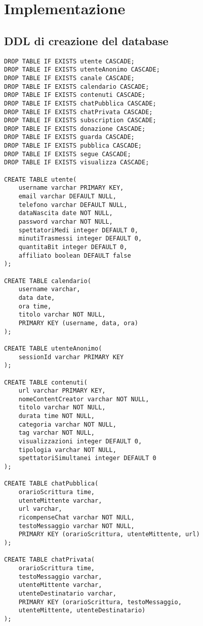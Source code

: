 \section{Implementazione}
\subsection{DDL di creazione del database}





\begin{lstlisting}
DROP TABLE IF EXISTS utente CASCADE;
DROP TABLE IF EXISTS utenteAnonimo CASCADE;
DROP TABLE IF EXISTS canale CASCADE;
DROP TABLE IF EXISTS calendario CASCADE;
DROP TABLE IF EXISTS contenuti CASCADE;
DROP TABLE IF EXISTS chatPubblica CASCADE;
DROP TABLE IF EXISTS chatPrivata CASCADE;
DROP TABLE IF EXISTS subscription CASCADE;
DROP TABLE IF EXISTS donazione CASCADE;
DROP TABLE IF EXISTS guarda CASCADE;
DROP TABLE IF EXISTS pubblica CASCADE;
DROP TABLE IF EXISTS segue CASCADE;
DROP TABLE IF EXISTS visualizza CASCADE;

CREATE TABLE utente(
    username varchar PRIMARY KEY,
    email varchar DEFAULT NULL,
    telefono varchar DEFAULT NULL,
    dataNascita date NOT NULL,
    password varchar NOT NULL,
    spettatoriMedi integer DEFAULT 0,
    minutiTrasmessi integer DEFAULT 0,
    quantitaBit integer DEFAULT 0,
    affiliato boolean DEFAULT false
);

CREATE TABLE calendario(
    username varchar,
    data date,
    ora time,
    titolo varchar NOT NULL,
    PRIMARY KEY (username, data, ora)
);

CREATE TABLE utenteAnonimo(
    sessionId varchar PRIMARY KEY
);

CREATE TABLE contenuti(
    url varchar PRIMARY KEY,
    nomeContentCreator varchar NOT NULL,
    titolo varchar NOT NULL,
    durata time NOT NULL,
    categoria varchar NOT NULL,
    tag varchar NOT NULL,
    visualizzazioni integer DEFAULT 0,
    tipologia varchar NOT NULL,
    spettatoriSimultanei integer DEFAULT 0
);

CREATE TABLE chatPubblica(
    orarioScrittura time,
    utenteMittente varchar,
    url varchar,
    ricompenseChat varchar NOT NULL,
    testoMessaggio varchar NOT NULL,
    PRIMARY KEY (orarioScrittura, utenteMittente, url)
);

CREATE TABLE chatPrivata(
    orarioScrittura time,
    testoMessaggio varchar,
    utenteMittente varchar,
    utenteDestinatario varchar,
    PRIMARY KEY (orarioScrittura, testoMessaggio, 
    utenteMittente, utenteDestinatario)
);


\end{lstlisting}
